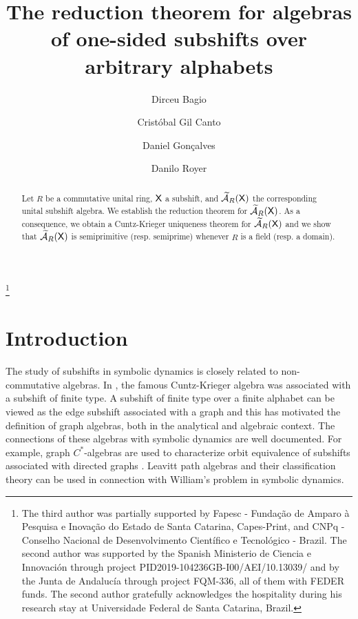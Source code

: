 \documentclass[a4paper,12pt]{amsart}
\title[The reduction theorem for algebras of subshifts]{The reduction theorem for algebras of one-sided subshifts over arbitrary alphabets}
\author[D. Bagio]{Dirceu Bagio}
\author[C. Gil Canto]{Cristóbal Gil Canto}
\author[D. Gonçalves]{Daniel Gonçalves}
\author[D. Royer]{Danilo Royer}
\theoremstyle{definition}
\theoremstyle{remark}
\numberwithin{equation}{section}
\newcommand{\osf}{{\normalfont \textsf{X}}}
\newcommand{\ualgshift}{\TCA_R(\osf)}
\newcommand{\CA}{\mathcal{A}}
\newcommand{\TCA}{\widetilde{\CA}}
\begin{document}

\thanks{The third author was partially supported by Fapesc - Fundação de Amparo à Pesquisa e Inovação do Estado de Santa Catarina, Capes-Print, and CNPq - Conselho Nacional de Desenvolvimento Científico e Tecnológico - Brazil. The second author was supported by the Spanish Ministerio de Ciencia e Innovaci\'on   through project  PID2019-104236GB-I00/AEI/10.13039/ and by the Junta de Andaluc\'{i}a  through project FQM-336,  all of them with FEDER funds. The second author gratefully acknowledges the hospitality during his research stay at Universidade Federal de Santa Catarina, Brazil.}


\begin{abstract} Let $R$ be a commutative unital ring, $\osf$ a subshift, and $\ualgshift$ the corresponding unital subshift algebra. We establish the reduction theorem for $\ualgshift$. As a consequence, we obtain a Cuntz-Krieger uniqueness theorem for $\ualgshift$ and we show that $\ualgshift$ is semiprimitive (resp. semiprime) whenever $R$ is a field (resp. a domain).
\end{abstract}

\maketitle


\section{Introduction}

The study of subshifts in symbolic dynamics is closely related to non-commutative algebras. In \cite{CuntzKrieger}, the famous Cuntz-Krieger algebra was associated with a subshift of finite type. A subshift of finite type over a finite alphabet can be viewed as the edge subshift associated with a graph and this has motivated the definition of graph algebras, both in the analytical and algebraic context. The connections of these algebras with symbolic dynamics are well documented. For example, graph $C^*$-algebras are used to characterize orbit equivalence of subshifts associated with directed graphs \cite{BCW}. Leavitt path algebras \cite{AbrAraMol, GroupoidLeavitt} and their classification theory can be used in connection with William's problem in symbolic dynamics\cite{CGGH, HazratClassificationLPA}. 
\end{document}
